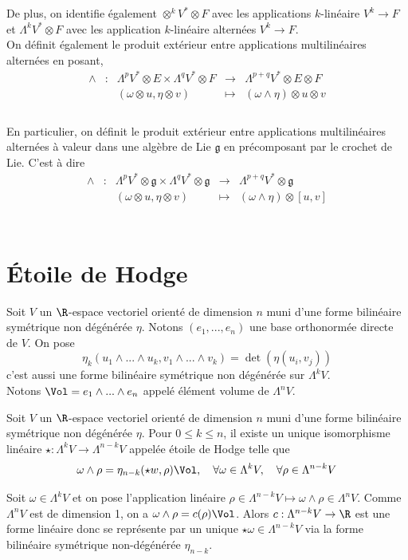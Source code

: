 De plus, on identifie également $\otimes^k V^* \otimes F$ avec les applications $k$-linéaire $V^k \to F$ et $\Lambda^k V^* \otimes F$ avec les application $k$-linéaire alternées $V^k \to F$. \\

On définit également le produit extérieur entre applications multilinéaires alternées en posant, 
$$\begin{array}{ccccc}
	\wedge & : & \Lambda^p V^* \otimes E \times \Lambda^q V^* \otimes F & \to & \Lambda^{p+q} V^* \otimes E \otimes F \\
		& & (\omega \otimes u, \eta \otimes v) & \mapsto & (\omega \wedge \eta) \otimes u \otimes v \\
\end{array}$$ \\

En particulier, on définit le produit extérieur entre applications multilinéaires alternées à valeur dans une algèbre de Lie $\mathfrak{g}$ en précomposant par le crochet de Lie. C'est à dire
$$\begin{array}{ccccc}
	\wedge & : & \Lambda^p V^* \otimes \mathfrak{g} \times \Lambda^q V^* \otimes \mathfrak{g} & \to & \Lambda^{p+q} V^* \otimes \mathfrak{g} \\
		& & (\omega \otimes u, \eta \otimes v) & \mapsto & (\omega \wedge \eta) \otimes [u, v] \\
\end{array}$$ \\

\section{Étoile de Hodge}

Soit $V$ un $\R$-espace vectoriel orienté de dimension $n$ muni d'une forme bilinéaire symétrique non dégénérée $\eta$. Notons $(e_1, ..., e_n)$ une base orthonormée directe de $V$. On pose 
$$\eta_k(u_1 \wedge ... \wedge u_k, v_1 \wedge ... \wedge v_k) = \det (\eta(u_i, v_j))$$
c'est aussi une forme bilinéaire symétrique non dégénérée sur $\Lambda^k V$.\\
Notons $\Vol = e_1 \wedge ... \wedge e_n$ appelé élément volume de $\Lambda^n V$. 

\begin{defi}
Soit $V$ un $\R$-espace vectoriel orienté de dimension $n$ muni d'une forme bilinéaire symétrique non dégénérée $\eta$. Pour $0 \leq k \leq n$, il existe un unique isomorphisme linéaire $\star : \Lambda^k V \to \Lambda^{n-k} V$ appelée étoile de Hodge telle que 
$$\omega \wedge \rho = \eta_{n-k}(\star w, \rho) \Vol, \quad \forall \omega \in \Lambda^k V, \quad \forall \rho \in \Lambda^{n-k} V$$
\end{defi} 
\begin{preu}
Soit $\omega \in \Lambda^k V$ et on pose l'application linéaire $\rho \in \Lambda^{n-k} V \mapsto \omega \wedge \rho \in \Lambda^n V$. Comme $\Lambda^n V$ est de dimension 1, on a $\omega \wedge \rho = c(\rho)\Vol$. Alors $c : \Lambda^{n-k} V \to \R$ est une forme linéaire donc se représente par un unique $\star\omega \in \Lambda^{n-k} V$ via la forme bilinéaire symétrique non-dégénérée $\eta_{n-k}$.
\end{preu}

